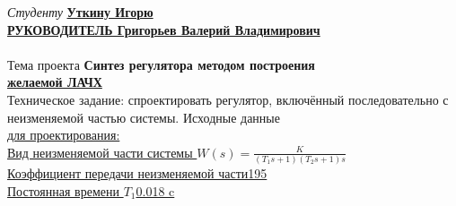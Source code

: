 \documentclass[fleqn, a4paper, 12pt, russian]{article}
\begin{document}
	\flushleft
	{\fontsize{14pt}{0cm}\selectfont \textit{Студенту} \bfseries\hspace{1cm}\underline{\hspace{0.25cm}Уткину Игорю\hspace{9.20cm}}} \\ \vspace{0.5cm}
	{\fontsize{14pt}{0cm}\selectfont \bfseries \underline{РУКОВОДИТЕЛЬ \hspace{3.17cm} Григорьев Валерий Владимирович\hspace{1cm}}}\\ \vspace{0.3cm}
	\underline{\hspace{\textwidth}} \\ \vspace{0.3cm}
	{\fontsize{14pt}{0cm}\hspace{0.5cm}Тема проекта \hspace{1cm}\bfseries Синтез регулятора методом построения\\ \underline{\hspace{4.8cm}желаемой ЛАЧХ\hspace{8.25cm}}} \\ \vspace{0.3cm}
	{\fontsize{14pt}{0cm}\hspace{0.5cm}Техническое задание: спроектировать регулятор, включённый последовательно с неизменяемой частью системы. Исходные данные\\ \underline{для проектирования:\hspace{12.4cm}}} \\ \vspace{0.2cm}
	{\fontsize{14pt}{0cm}\selectfont \underline{Вид неизменяемой части системы \hspace{3cm}$W(s) = \displaystyle{\frac{K}{(T_1s + 1)(T_2s + 1)s}}$\hspace{0.2cm}}} \\ \vspace{0.2cm}
	{\fontsize{14pt}{0cm}\selectfont \underline{Коэффициент передачи неизменяемой части\hspace{5.8cm}195\hspace{0.7cm}}} \\ \vspace{0.2cm}
	{\fontsize{14pt}{0cm}\selectfont \underline{Постоянная времени $T_1$\hspace{9.8cm}0.018 c\hspace{0.4cm}}} \\ \vspace{0.2cm}
\end{document}
